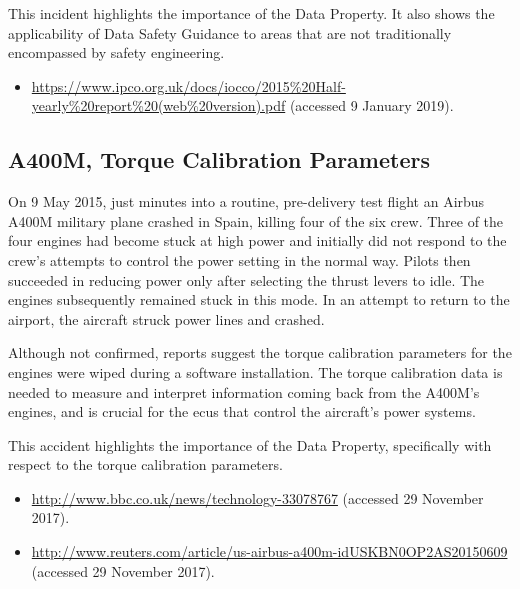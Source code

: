 This incident highlights the importance of the  Data Property. It also shows the applicability of Data Safety Guidance to areas that are not traditionally encompassed by safety engineering.

\begin{samepage}
\begin{itemize}
  \item \raggedright{\href{https://www.ipco.org.uk/docs/iocco/2015\%20Half-yearly\%20report\%20(web\%20version).pdf}{https://www.ipco.org.uk/docs/iocco/2015\%20Half-yearly\%20report\%20(web\%20version).pdf} (accessed 9 January 2019).}
\end{itemize}
\end{samepage}


\subsection{A400M, Torque Calibration Parameters} \label{bkm:incacc:a400m}
On 9 May 2015, just minutes into a routine, pre-delivery test flight an Airbus A400M military plane crashed in Spain, killing four of the six crew. Three of the four engines had become stuck at high power and initially did not respond to the crew's attempts to control the power setting in the normal way. Pilots then succeeded in reducing power only after selecting the thrust levers to idle. The engines subsequently remained stuck in this mode. In an attempt to return to the airport, the aircraft struck power lines and crashed.  

Although not confirmed, reports suggest the torque calibration parameters for the engines were wiped during a software installation. The torque calibration data is needed to measure and interpret information coming back from the A400M's engines, and is crucial for the \glspl{ecu} that control the aircraft's power systems. 

This accident highlights the importance of the  Data Property, specifically with respect to the torque calibration parameters.

\begin{samepage}
\begin{itemize}
  \item \raggedright{\href{http://www.bbc.co.uk/news/technology-33078767}{http://www.bbc.co.uk/news/technology-33078767} (accessed 29 November 2017).}
  \item \raggedright{\href{http://www.reuters.com/article/us-airbus-a400m-idUSKBN0OP2AS20150609}{http://www.reuters.com/article/us-airbus-a400m-idUSKBN0OP2AS20150609} (accessed 29 November 2017).}
\end{itemize}
\end{samepage}


